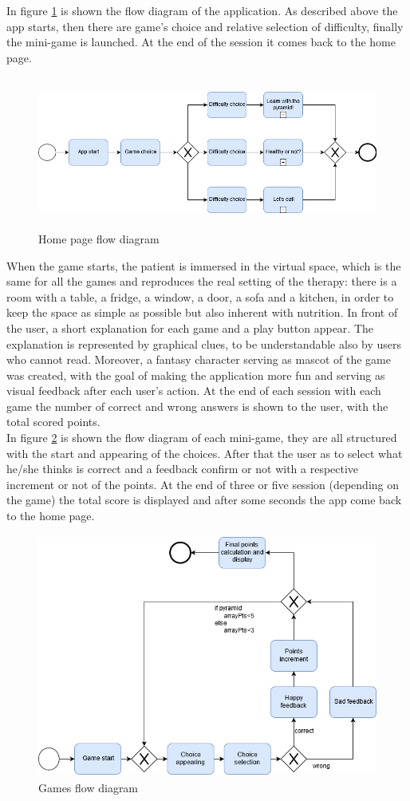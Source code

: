 In figure \ref{fig:homeflow} is shown the flow diagram of the application. As described above the app starts, then there are game's choice and relative selection of difficulty, finally the mini-game is launched. At the end of the session it comes back to the home page.\\
\begin{figure}[H]
\centering
\includegraphics[width=15cm, height=5cm]{immagini/flow1.png}
\caption{Home page flow diagram}\label{fig:homeflow}
\end{figure}
When the game starts, the patient is immersed in the virtual space, which is the same for all the games and reproduces the real setting of the therapy: there is a room with a table, a fridge, a window, a door, a sofa and a kitchen, in order to keep the space as simple as possible but also inherent with nutrition. In front of the user, a short explanation for each game and a play button appear. The explanation is represented by graphical clues, to be understandable also by users who cannot read. Moreover, a fantasy character serving as mascot of the game was created, with the goal of making the application more fun and serving as visual feedback after each user's action. At the end of each session with each game the number of correct and wrong answers is shown to the user, with the total scored points.\\
In figure \ref{fig:gameflow} is shown the flow diagram of each mini-game, they are all structured with the start and appearing of the choices. After that the user as to select what he/she thinks is correct and a feedback confirm or not with a respective increment or not of the points. At the end of three or five session (depending on the game) the total score is displayed and after some seconds the app come back to the home page.\\
\begin{figure}[H]
\centering
\includegraphics[width=15cm, height=8cm]{immagini/flow2.png}
\caption{Games flow diagram}\label{fig:gameflow}
\end{figure}
